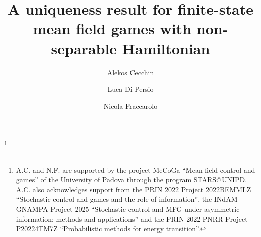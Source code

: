 \documentclass[11pt,a4paper]{amsart}
\theoremstyle{definition}
\begin{document}
	


\title[Uniqueness for finite-state MFG with non-separable Hamiltonian]{A uniqueness result for finite-state mean field games with non-separable Hamiltonian} 

\thanks{
	A.C. and N.F. are supported by the project MeCoGa ``Mean field control and games'' of the University of Padova through the program STARS@UNIPD. A.C. also acknowledges support  from 
	the PRIN 2022 Project 2022BEMMLZ ``Stochastic control and games and the role of information'', 
	the INdAM-GNAMPA Project 2025 ``Stochastic control and MFG under asymmetric information: methods and applications'' and the PRIN 2022 PNRR Project P20224TM7Z  ``Probabilistic methods for energy transition''.
}




\author{%
	Alekos Cecchin}

\author{Luca Di Persio}

\author{Nicola Fraccarolo}

\address[A. Cecchin and N. Fraccarolo]{Department of Mathematics ``T. Levi-Civita'', University of Padova, 
	\newline \indent Via Trieste 63, 35121 Padova, Italy} 


\address[L. Di Persio]{
	Department of Computer Science, University of Verona, 
	\newline \indent Strada le Grazie 15, 37134 Verona, Italy}      


	
	
\end{document}
